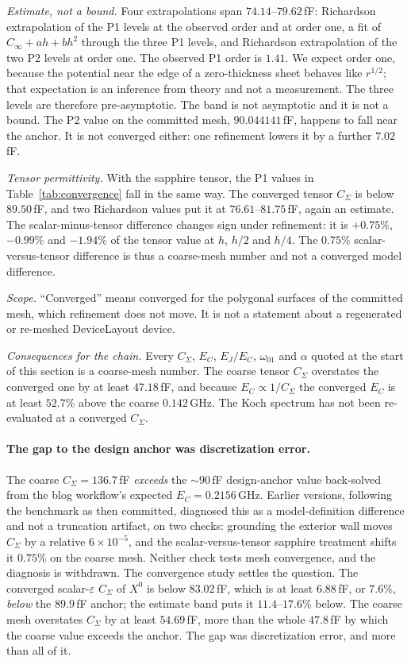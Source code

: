 \documentclass{anvil-paper}
\begin{document}
\emph{Estimate, not a bound.} Four extrapolations span
$74.14$--$79.62$\,fF: Richardson extrapolation of the P1 levels at the
observed order and at order one, a fit of $C_\infty + a h + b h^2$
through the three P1 levels, and Richardson extrapolation of the two P2
levels at order one. The observed P1 order is $1.41$. We expect order
one, because the potential near the edge of a zero-thickness sheet
behaves like $r^{1/2}$; that expectation is an inference from theory
and not a measurement. The three levels are therefore pre-asymptotic.
The band is not asymptotic and it is not a bound. The P2 value on the
committed mesh, $90.044141$\,fF, happens to fall near the anchor. It is
not converged either: one refinement lowers it by a further
$7.02$\,fF.

\emph{Tensor permittivity.} With the sapphire tensor, the P1 values in
Table~\ref{tab:convergence} fall in the same way. The converged tensor
$C_\Sigma$ is below $89.50$\,fF, and two Richardson values put it at
$76.61$--$81.75$\,fF, again an estimate. The scalar-minus-tensor
difference changes sign under refinement: it is $+0.75\%$, $-0.99\%$
and $-1.94\%$ of the tensor value at $h$, $h/2$ and $h/4$. The $0.75\%$
scalar-versus-tensor difference is thus a coarse-mesh number and not a
converged model difference.

\emph{Scope.} ``Converged'' means converged for the polygonal surfaces
of the committed mesh, which refinement does not move. It is not a
statement about a regenerated or re-meshed DeviceLayout device.

\emph{Consequences for the chain.} Every $C_\Sigma$, $E_C$, $E_J/E_C$,
$\omega_{01}$ and $\alpha$ quoted at the start of this section is a
coarse-mesh number. The coarse tensor $C_\Sigma$ overstates the
converged one by at least $47.18$\,fF, and because
$E_C \propto 1/C_\Sigma$ the converged $E_C$ is at least $52.7\%$ above
the coarse $0.142$\,GHz. The Koch spectrum has not been re-evaluated at
a converged $C_\Sigma$.

\paragraph{The gap to the design anchor was discretization error.}
The coarse $C_\Sigma = 136.7$\,fF \emph{exceeds} the ${\sim}90$\,fF
design-anchor value back-solved from the blog workflow's expected
$E_C = 0.2156$\,GHz. Earlier versions, following the benchmark as then
committed, diagnosed this as a model-definition difference and not a
truncation artifact, on two checks: grounding the exterior wall moves
$C_\Sigma$ by a relative $6\times10^{-5}$, and the scalar-versus-tensor
sapphire treatment shifts it $0.75\%$ on the coarse mesh. Neither check
tests mesh convergence, and the diagnosis is withdrawn. The convergence
study settles the question. The converged scalar-$\varepsilon$
$C_\Sigma$ of $X^0$ is below $83.02$\,fF, which is at least
$6.88$\,fF, or $7.6\%$, \emph{below} the $89.9$\,fF anchor; the
estimate band puts it $11.4$--$17.6\%$ below. The coarse mesh
overstates $C_\Sigma$ by at least $54.69$\,fF, more than the whole
$47.8$\,fF by which the coarse value exceeds the anchor. The gap was
discretization error, and more than all of it.
\end{document}
